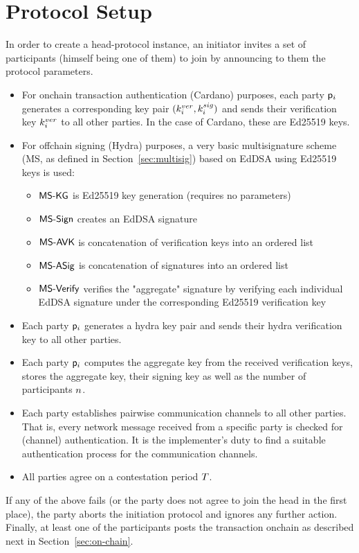 
\section{Protocol Setup}\label{sec:setup}
In order to create a head-protocol instance, an initiator invites a set of
participants (himself being one of them) to join by announcing to them the
protocol parameters.

\begin{itemize}
  \item For onchain transaction authentication (Cardano) purposes, each party $\mathsf p_i$ generates a
        corresponding key pair $(k^{ver}_{i},k^{sig}_{i})$ and sends their verification key $k^{ver}_{i}$ to all other parties. In the case of Cardano, these are Ed25519 keys.

  \item For offchain signing (Hydra) purposes, a very basic multisignature scheme (MS, as defined in Section~\ref{sec:multisig}) based on EdDSA using Ed25519 keys is used:
        \begin{itemize}
          \item $\mathsf{MS\textsf{-}{}KG}$ is Ed25519 key generation (requires no parameters)
          \item $\mathsf{MS\textsf{-}{}Sign}$ creates an EdDSA signature
          \item $\mathsf{MS\textsf{-}{}AVK}$ is concatenation of verification keys into an ordered list
          \item $\mathsf{MS\textsf{-}{}ASig}$ is concatenation of signatures into an ordered list
          \item $\mathsf{MS\textsf{-}{}Verify}$ verifies the "aggregate" signature by verifying each individual EdDSA signature under the corresponding Ed25519 verification key
        \end{itemize}
        
  \item Each party $\mathsf p_i$ generates a hydra key pair and sends their hydra verification key to all other parties.

  \item Each party $\mathsf p_i$ computes the aggregate key from the received verification keys, stores the aggregate key,
        their signing key as well as the number of participants $n$.
        
  \item Each party establishes pairwise communication channels to all other parties. That is, every network message received from a specific party is checked for (channel) authentication. It is the implementer’s duty to find a suitable authentication process for the communication channels.
  
  \item All parties agree on a contestation period $T$.
\end{itemize}

If any of the above fails (or the party does not agree to join the head in the
first place), the party aborts the initiation protocol and ignores any further
action. Finally, at least one of the participants posts the \mtxInit{} transaction
onchain as described next in Section~\ref{sec:on-chain}.

